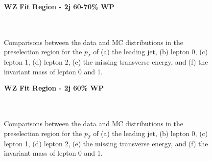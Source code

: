 \begin{figure}[H]
    \centering
    \textbf{WZ Fit Region - 2j 60-70\% WP}\\
    \\
    \\
    \caption{Comparisons between the data and MC distributions in the preselection region for the $p_T$ of (a) the leading jet, (b) lepton 0, (c) lepton 1, (d) lepton 2, (e) the missing transverse energy, and (f) the invariant mass of lepton 0 and 1.}
    \label{kin:WP_2j_60_70}
\end{figure}

\begin{figure}[H]
    \centering
    \textbf{WZ Fit Region - 2j 60\% WP}\\
    \\
    \\
    \caption{Comparisons between the data and MC distributions in the preselection region for the $p_T$ of (a) the leading jet, (b) lepton 0, (c) lepton 1, (d) lepton 2, (e) the missing transverse energy, and (f) the invariant mass of lepton 0 and 1.}
    \label{kin:WP_2j_60}
\end{figure}

